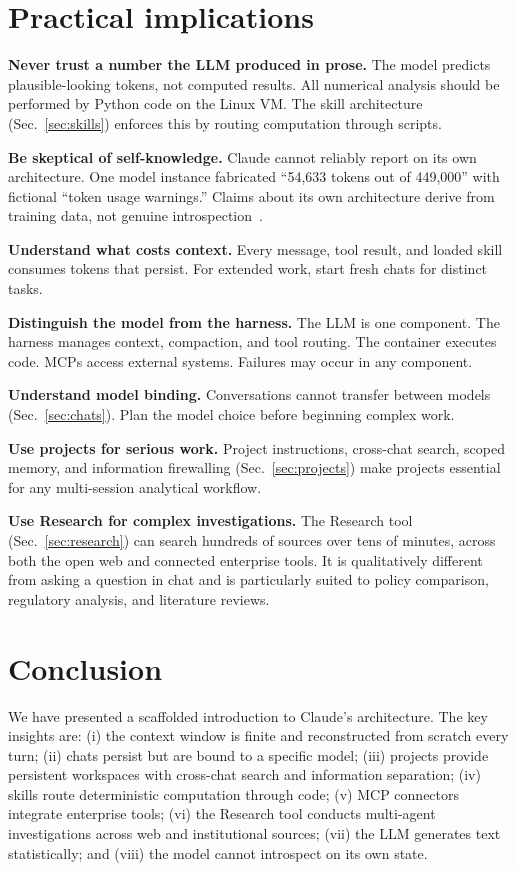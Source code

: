 \documentclass[12pt]{article}
\begin{document}
\section{Practical implications}
\label{sec:implications}

\textbf{Never trust a number the LLM produced in prose.} The model predicts plausible-looking tokens, not computed results. All numerical analysis should be performed by Python code on the Linux VM. The skill architecture (Sec.~\ref{sec:skills}) enforces this by routing computation through scripts.

\textbf{Be skeptical of self-knowledge.} Claude cannot reliably report on its own architecture. One model instance fabricated ``54,633 tokens out of 449,000'' with fictional ``token usage warnings.'' Claims about its own architecture derive from training data, not genuine introspection~\cite{anthropic_api_docs}.

\textbf{Understand what costs context.} Every message, tool result, and loaded skill consumes tokens that persist. For extended work, start fresh chats for distinct tasks.

\textbf{Distinguish the model from the harness.} The LLM is one component. The harness manages context, compaction, and tool routing. The container executes code. MCPs access external systems. Failures may occur in any component.

\textbf{Understand model binding.} Conversations cannot transfer between models (Sec.~\ref{sec:chats}). Plan the model choice before beginning complex work.

\textbf{Use projects for serious work.} Project instructions, cross-chat search, scoped memory, and information firewalling (Sec.~\ref{sec:projects}) make projects essential for any multi-session analytical workflow.

\textbf{Use Research for complex investigations.} The Research tool (Sec.~\ref{sec:research}) can search hundreds of sources over tens of minutes, across both the open web and connected enterprise tools. It is qualitatively different from asking a question in chat and is particularly suited to policy comparison, regulatory analysis, and literature reviews.

\section{Conclusion}
\label{sec:conclusion}

We have presented a scaffolded introduction to Claude's architecture. The key insights are: (i) the context window is finite and reconstructed from scratch every turn; (ii) chats persist but are bound to a specific model; (iii) projects provide persistent workspaces with cross-chat search and information separation; (iv) skills route deterministic computation through code; (v) MCP connectors integrate enterprise tools; (vi) the Research tool conducts multi-agent investigations across web and institutional sources; (vii) the LLM generates text statistically; and (viii) the model cannot introspect on its own state.
\end{document}
